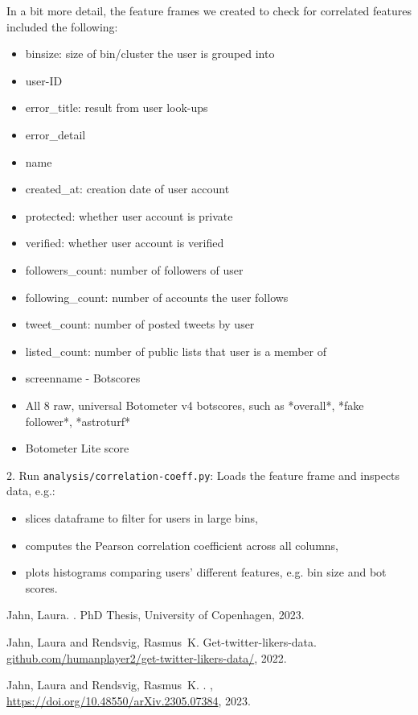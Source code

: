 \documentclass[10pt,english,sigconf,authoryear,nonacm]{article}
\begin{document}
In a bit more detail, the feature frames we created to check for correlated
features included the following:
\begin{itemize}
\item binsize: size of bin/cluster the user is grouped into
\item user-ID
\item error\_title: result from user look-ups
\item error\_detail
\item name
\item created\_at: creation date of user account
\item protected: whether user account is private
\item verified: whether user account is verified
\item followers\_count: number of followers of user
\item following\_count: number of accounts the user follows
\item tweet\_count: number of posted tweets by user
\item listed\_count: number of public lists that user is a member of
\item screenname - Botscores
\item All 8 raw, universal Botometer v4 botscores, such as {*}overall{*},
{*}fake follower{*}, {*}astroturf{*}
\item Botometer Lite score
\end{itemize}
2. Run \texttt{analysis/correlation-coeff.py}: Loads the feature frame
and inspects data, e.g.:
\begin{itemize}
\item slices dataframe to filter for users in large bins,
\item computes the Pearson correlation coefficient across all columns,
\item plots histograms comparing users' different features, e.g. bin size
and bot scores.
\end{itemize}
\begin{thebibliography}{1}

	{Jahn, Laura}.
	.
	\newblock PhD Thesis, University of Copenhagen, 2023.
	
	{Jahn, Laura and Rendsvig, Rasmus~K.}
	\newblock Get-twitter-likers-data.
	\newblock \href{https://github.com/humanplayer2/get-twitter-likers-data/}{github.com/humanplayer2/get-twitter-likers-data/}, 2022.
	
	{Jahn, Laura and Rendsvig, Rasmus~K.}
	.
	, \href{https://doi.org/10.48550/arXiv.2305.07384}{https://doi.org/10.48550/arXiv.2305.07384}, 2023. 
	
	\end{thebibliography}
	
\end{document}
